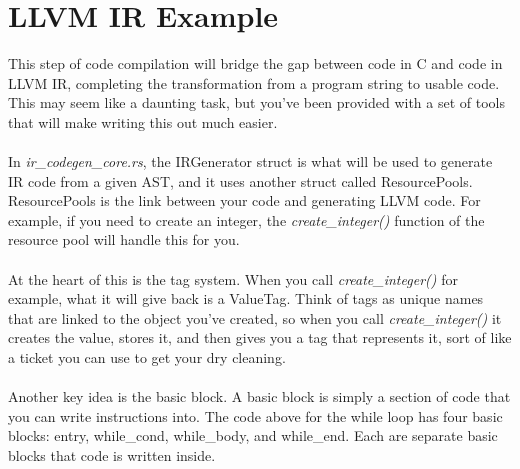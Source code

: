 \documentclass[
	12pt, %
]{fphw}
\begin{document}
\section*{LLVM IR Example}


This step of code compilation will bridge the gap between code in C and code in LLVM IR, completing the transformation from a program string to usable code. This may seem like a daunting task, but you've been provided with a set of tools that will make writing this out much easier.\\
\\
In \textit{ir\_codegen\_core.rs}, the IRGenerator struct is what will be used to generate IR code from a given AST, and it uses another struct called ResourcePools. ResourcePools is the link between your code and generating LLVM code. For example, if you need to create an integer, the \textit{create\_integer()} function of the resource pool will handle this for you.\\
\\
At the heart of this is the tag system. When you call \textit{create\_integer()} for example, what it will give back is a ValueTag. Think of tags as unique names that are linked to the object you've created, so when you call \textit{create\_integer()} it creates the value, stores it, and then gives you a tag that represents it, sort of like a ticket you can use to get your dry cleaning.\\
\\
Another key idea is the basic block. A basic block is simply a section of code that you can write instructions into. The code above for the while loop has four basic blocks: entry, while\_cond, while\_body, and while\_end. Each are separate basic blocks that code is written inside.
\end{document}
